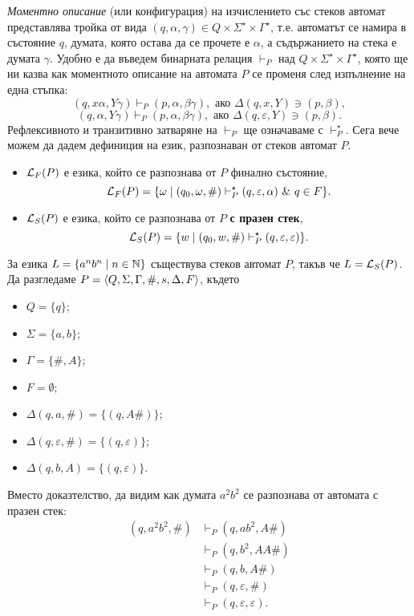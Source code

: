 {\em Моментно описание} (или конфигурация) на изчислението със стеков автомат представлява тройка от вида $(q,\alpha,\gamma) \in Q\times\Sigma^\star\times\Gamma^\star$,
т.е. автоматът се намира в състояние $q$, думата, която остава да се прочете е $\alpha$,
а съдържанието на стека е думата $\gamma$.
Удобно е да въведем бинарната релация $\vdash_P$ над $Q\times\Sigma^\star\times\Gamma^\star$,
която ще ни казва как моментното описание на автомата $P$ се променя след изпълнение на една стъпка:
\[(q,x\alpha,Y\gamma) \vdash_P (p,\alpha,\beta\gamma), \text{ ако } \Delta(q,x,Y) \ni (p,\beta),\]
\[(q,\alpha,Y\gamma) \vdash_P (p,\alpha,\beta\gamma), \text{ ако } \Delta(q,\varepsilon,Y) \ni (p,\beta).\]
Рефлексивното и транзитивно затваряне на $\vdash_P$ ще означаваме с $\vdash^\star_P$.
Сега вече можем да дадем дефиниция на език, разпознаван от стеков автомат $P$.
\begin{itemize}
\item
  $\mathcal{L}_F(P)$ е езика, който се разпознава от $P$ { финално състояние},
  \[\L_F(P) = \{\omega \mid (q_0,\omega,\#) \vdash^\star_P (q,\varepsilon,\alpha)\ \&\ q \in F\}.\]    
\item
  $\mathcal{L}_S(P)$ е езика, който се разпознава от $P$  {\bf с празен стек},
  \[\mathcal{L}_S(P) = \{w\mid (q_0,w,\#) \vdash^\star_P (q,\varepsilon,\varepsilon)\}.\]    
\end{itemize}

\begin{example}
  \label{ex:anbn}
  За езика $L = \{a^nb^n\mid n\in\mathbb{N}\}$ съществува стеков автомат $P$, такъв че
  $L = \mathcal{L}_S(P)$.
  Да разгледаме $P = \langle{Q,\Sigma,\Gamma,\#,s,\Delta,F}\rangle$, където
  \begin{itemize}
  \item
    $Q = \{q\}$;
  \item
    $\Sigma = \{a,b\}$;
  \item
    $\Gamma = \{\#,A\}$;
  \item
    $F = \emptyset$;
  \item 
    $\Delta(q,a,\#) = \{(q, A\#)\}$;
  \item 
    $\Delta(q,\varepsilon,\#) = \{(q,\varepsilon)\}$;
  \item 
    $\Delta(q,b,A) = \{(q,\varepsilon)\}$.
  \end{itemize}
  Вместо доказтелство, да видим как думата $a^2b^2$ се разпознава от автомата с празен стек:
  \begin{align*}
    (q,a^2b^2,\#) & \vdash_P (q,ab^2,A\#) \\
    & \vdash_P (q,b^2, AA\#)\\
    & \vdash_P (q,b,A\#)\\
    & \vdash_P (q,\varepsilon,\#)\\
    & \vdash_P (q,\varepsilon,\varepsilon).
  \end{align*}
\end{example}

